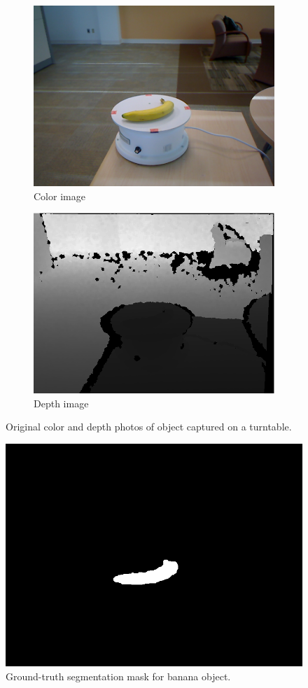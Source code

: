 \begin{figure}
	\centering
	\begin{subfigure}[b]{0.45\linewidth}
		\includegraphics[width=\textwidth]{img/banana_1_1_1.png}
		\caption{Color image}
	\end{subfigure}   	
	\begin{subfigure}[b]{0.45\linewidth}
		\includegraphics[width=\textwidth]{img/banana_1_1_1_depth.png}
		\caption{Depth image}
	\end{subfigure}
	\caption{Original color and depth photos of object captured on a turntable.}
	\label{fig:orig_img}
\end{figure}

\begin{figure}
	\centering
	\includegraphics[width=0.5\linewidth]{img/banana_1_1_1_mask.png}
	\caption{Ground-truth segmentation mask for banana object.}
	\label{fig:img_mask}
\end{figure}

